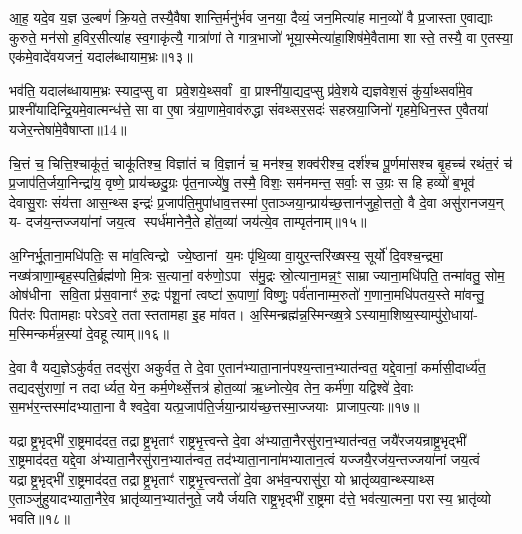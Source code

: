 आ॒ह॒ यदे॒व य॒ज्ञ उ॒ल्बणं॑ क्रि॒यते॒ तस्यै॒वैषा शान्ति॒र्मनु॑र्भव ज॒नया॒ दैव्यं॒ जन॒मित्या॑ह मान॒व्यो॑ वै प्र॒जास्ता ए॒वाद्याः कुरुते॒ मन॑सो ह॒विर॒सीत्या॑ह स्व॒गाकृ॑त्यै॒ गात्रा॑णां ते गात्र॒भाजो॑ भूया॒स्मेत्या॑हा॒शिष॑मे॒वैतामा शास्ते॒ तस्यै॒ वा ए॒तस्या॒ एक॑मे॒वादे॑वयजनं॒ यदाल॑ब्धायाम॒भ्रः॥१३॥

भव॑ति॒ यदाल॑ब्धायाम॒भ्रः स्याद॒प्सु वा प्रवे॒शये॒थ्सर्वां वा॒ प्राश्नी॑या॒द्यद॒प्सु प्र॑वे॒शयेद्यज्ञवेश॒सं कु॑र्या॒थ्सर्वा॑मे॒व प्राश्नी॑यादिन्द्रि॒यमे॒वात्मन्ध॑त्ते॒ सा वा ए॒षा त्र॑या॒णामे॒वाव॑रुद्धा संवथ्सर॒सदः॑ सहस्रया॒जिनो॑ गृहमे॒धिन॒स्त ए॒वैतया॑ यजेर॒न्तेषा॑मे॒वैषाप्ता॥14॥

{\anuvakamend[{यथ्स्वेन॑ सारस्व॒तीमा ल॑भेत॒ यः कामा॑य त्वा॒ कामोऽप॒ इत्य॒भ्रो द्विच॑त्वारिशच्च॥३॥}]}

चि॒त्तं च॒ चित्ति॒श्चाकू॑तं॒ चाकू॑तिश्च॒ विज्ञा॑तं च वि॒ज्ञानं॑ च॒ मन॑श्च॒ शक्व॑रीश्च॒ दर्\mbox{}श॑श्च पू॒र्णमा॑सश्च बृ॒हच्च॑ रथंत॒रं च॑ प्र॒जाप॑ति॒र्जया॒निन्द्रा॑य॒ वृष्णे॒ प्राय॑च्छदु॒ग्रः पृ॑त॒नाज्ये॑षु॒ तस्मै॒ विशः॒ सम॑नमन्त॒ सर्वाः॒ स उ॒ग्रः स हि हव्यो॑ ब॒भूव॑ देवासु॒राः संय॑त्ता आस॒न्थ्स इन्द्रः॑ प्र॒जाप॑ति॒मुपा॑धाव॒त्तस्मा॑ ए॒ताञ्जया॒न्प्राय॑च्छ॒त्तान॑जुहो॒त्ततो॒ वै दे॒वा असु॑रानजय॒न् य- दज॑य॒न्तज्जया॑नां जय॒त्व स्पर्ध॑मानेनै॒ते हो॑त॒व्या॑ जय॑त्ये॒व ताम्पृत॑नाम्॥१५॥

{\anuvakamend[{उप॒ पञ्च॑विशतिश्च॥४॥}]}

अ॒ग्निर्भू॒ताना॒मधि॑पतिः॒ स मा॑व॒त्विन्द्रो ज्ये॒ष्ठानां य॒मः पृ॑थि॒व्या वा॒युर॒न्तरि॑ख्षस्य॒ सूर्यो॑ दि॒वश्च॒न्द्रमा॒ नख्ष॑त्राणा॒म्बृह॒स्पति॒र्ब्रह्म॑णो मि॒त्रः स॒त्यानां॒ वरु॑णो॒ऽपा स॑मु॒द्रः स्रो॒त्याना॒मन्न॒ꣳ॒ साम्राज्याना॒मधि॑पति॒ तन्मा॑वतु॒ सोम॒ ओष॑धीना सवि॒ता प्र॑स॒वानाꣳ॑ रु॒द्रः प॑शू॒नां त्वष्टा॑ रू॒पाणां॒ विष्णुः॒ पर्व॑तानाम्म॒रुतो॑ ग॒णाना॒मधि॑पतय॒स्ते मा॑वन्तु॒ पित॑रः पितामहाः परेऽवरे॒ ततास्ततामहा इ॒ह मा॑वत। अ॒स्मिन्ब्रह्म॑न्न॒स्मिन्ख्ष॒त्रेऽस्यामा॒शिष्य॒स्याम्पु॑रो॒धाया॑- म॒स्मिन्कर्म॑न्न॒स्यां दे॒वहूत्याम्॥१६॥

{\anuvakamend[{अ॒व॒रे॒ स॒प्तद॑श च॥५॥}]}

दे॒वा वै यद्य॒ज्ञेऽकु॑र्वत॒ तदसु॑रा अकुर्वत॒ ते दे॒वा ए॒तान॑भ्याता॒नान॑पश्य॒न्तान॒भ्यात॑न्वत॒ यद्दे॒वानां॒ कर्मासी॒दार्ध्य॑त॒ तद्यदसु॑राणां॒ न तदार्ध्यत॒ येन॒ कर्म॒णेर्थ्से॒त्तत्र॑ होत॒व्या॑ ऋ॒ध्नोत्ये॒व तेन॒ कर्म॑णा॒ यद्विश्वे॑ दे॒वाः स॒मभ॑र॒न्तस्मा॑दभ्याता॒ना वैश्वदे॒वा यत्प्र॒जाप॑ति॒र्जया॒न्प्राय॑च्छ॒त्तस्मा॒ज्जयाः प्राजाप॒त्याः॥१७॥

यद्राष्ट्र॒भृद्भी॑ रा॒ष्ट्रमाद॑दत॒ तद्राष्ट्र॒भृताꣳ॑ राष्ट्रभृ॒त्त्वन्ते दे॒वा अ॑भ्याता॒नैरसु॑रान॒भ्यात॑न्वत॒ जयै॑रजयन्राष्ट्र॒भृद्भी॑ रा॒ष्ट्रमाद॑दत॒ यद्दे॒वा अ॑भ्याता॒नैरसु॑रान॒भ्यात॑न्वत॒ तद॑भ्याता॒नाना॑मभ्यातान॒त्वं यज्जयै॒रज॑य॒न्तज्जया॑नां जय॒त्वं यद्राष्ट्र॒भृद्भी॑ रा॒ष्ट्रमाद॑दत॒ तद्राष्ट्र॒भृताꣳ॑ राष्ट्रभृ॒त्त्वन्ततो॑ दे॒वा अभ॑व॒न्परासु॑रा॒ यो भ्रातृ॑व्यवा॒न्थ्स्याथ्स ए॒ताञ्जु॑हुयादभ्याता॒नैरे॒व भ्रातृ॑व्यान॒भ्यात॑नुते॒ जयैर्जयति राष्ट्र॒भृद्भी॑ रा॒ष्ट्रमा द॑त्ते॒ भव॑त्या॒त्मना॒ परास्य॒ भ्रातृ॑व्यो भवति॥१८॥

